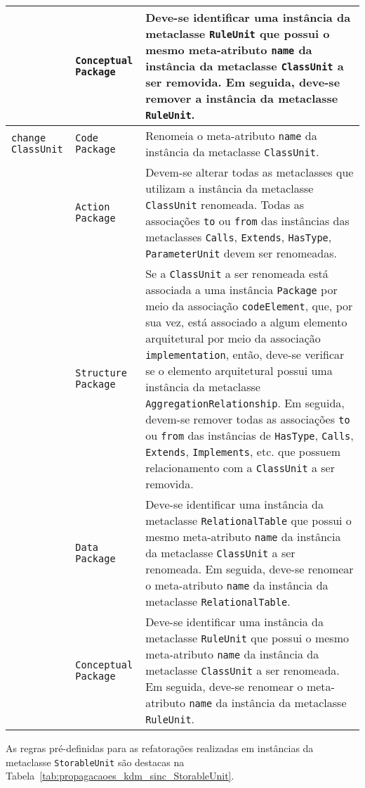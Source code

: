 \begin{longtable}{ | m{1.9cm} | m{3.57cm}| m{9.3cm} | }
\cline{2-3}
& \texttt{Conceptual Package} & Deve-se identificar uma instância da metaclasse \texttt{RuleUnit} que possui o mesmo meta-atributo \texttt{name} da instância da metaclasse \texttt{ClassUnit} a ser removida. Em seguida, deve-se remover a instância da metaclasse \texttt{RuleUnit}. \tabularnewline
\hline
\texttt{change} \texttt{ClassUnit} & \texttt{Code Package} & Renomeia o meta-atributo \texttt{name} da instância da metaclasse \texttt{ClassUnit}.\tabularnewline
\cline{2-3}
& \texttt{Action Package} & Devem-se alterar todas as metaclasses que utilizam a instância da metaclasse \texttt{ClassUnit} renomeada. Todas as associações \texttt{to} ou \texttt{from} das instâncias das metaclasses \texttt{Calls}, \texttt{Extends}, \texttt{HasType}, \texttt{ParameterUnit} devem ser renomeadas. \tabularnewline
\cline{2-3}
& \texttt{Structure Package} & Se a \texttt{ClassUnit} a ser renomeada está associada a uma instância \texttt{Package} por meio da associação \texttt{codeElement}, que, por sua vez, está associado a algum elemento arquitetural por meio da associação \texttt{implementation}, então, deve-se verificar se o elemento arquitetural possui uma instância da metaclasse \texttt{AggregationRelationship}. Em seguida, devem-se remover todas as associações \texttt{to} ou \texttt{from} das instâncias de \texttt{HasType}, \texttt{Calls}, \texttt{Extends}, \texttt{Implements}, etc. que possuem relacionamento com a \texttt{ClassUnit} a ser removida. \tabularnewline
\cline{2-3}
& \texttt{Data Package} & Deve-se identificar uma instância da metaclasse \texttt{RelationalTable} que possui o mesmo meta-atributo \texttt{name} da instância da metaclasse \texttt{ClassUnit} a ser renomeada. Em seguida, deve-se renomear o meta-atributo \texttt{name} da instância da metaclasse \texttt{RelationalTable}. \tabularnewline
\cline{2-3}
& \texttt{Conceptual Package} & Deve-se identificar uma instância da metaclasse \texttt{RuleUnit} que possui o mesmo meta-atributo \texttt{name} da instância da metaclasse \texttt{ClassUnit} a ser renomeada. Em seguida, deve-se renomear o meta-atributo \texttt{name} da  instância da metaclasse \texttt{RuleUnit}. \tabularnewline
 \end{longtable}

As regras pré-definidas para as refatorações realizadas em instâncias da metaclasse \texttt{StorableUnit} são destacas na Tabela~\ref{tab:propagacaoes_kdm_sinc_StorableUnit}.


